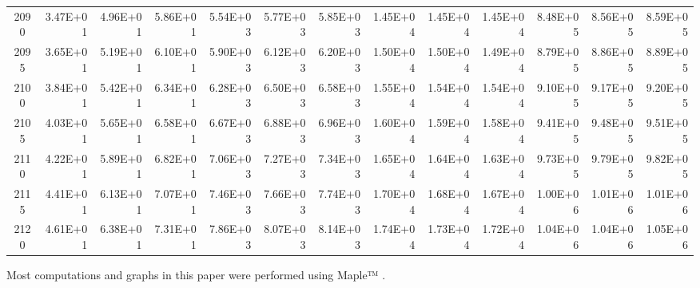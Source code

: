 \documentclass{article}
\begin{document}
\begin{table}
\begin{tabular}{crrr|rrr|rrr|rrr}
2090     & 3.47E+01 & 4.96E+01 & 5.86E+01 & 5.54E+03 & 5.77E+03 & 5.85E+03 & 1.45E+04 & 1.45E+04 & 1.45E+04 & 8.48E+05 & 8.56E+05 & 8.59E+05 \\
2095     & 3.65E+01 & 5.19E+01 & 6.10E+01 & 5.90E+03 & 6.12E+03 & 6.20E+03 & 1.50E+04 & 1.50E+04 & 1.49E+04 & 8.79E+05 & 8.86E+05 & 8.89E+05 \\
2100     & 3.84E+01 & 5.42E+01 & 6.34E+01 & 6.28E+03 & 6.50E+03 & 6.58E+03 & 1.55E+04 & 1.54E+04 & 1.54E+04 & 9.10E+05 & 9.17E+05 & 9.20E+05 \\
2105     & 4.03E+01 & 5.65E+01 & 6.58E+01 & 6.67E+03 & 6.88E+03 & 6.96E+03 & 1.60E+04 & 1.59E+04 & 1.58E+04 & 9.41E+05 & 9.48E+05 & 9.51E+05 \\
2110     & 4.22E+01 & 5.89E+01 & 6.82E+01 & 7.06E+03 & 7.27E+03 & 7.34E+03 & 1.65E+04 & 1.64E+04 & 1.63E+04 & 9.73E+05 & 9.79E+05 & 9.82E+05 \\
2115     & 4.41E+01 & 6.13E+01 & 7.07E+01 & 7.46E+03 & 7.66E+03 & 7.74E+03 & 1.70E+04 & 1.68E+04 & 1.67E+04 & 1.00E+06 & 1.01E+06 & 1.01E+06 \\
2120     & 4.61E+01 & 6.38E+01 & 7.31E+01 & 7.86E+03 & 8.07E+03 & 8.14E+03 & 1.74E+04 & 1.73E+04 & 1.72E+04 & 1.04E+06 & 1.04E+06 & 1.05E+06
\end{tabular}   \end{table}
\clearpage

\vskip 20pt
 Most computations and graphs in this paper were performed using Maple™ \cite{MapleCite2022-Computations}. 




%
\end{document}
